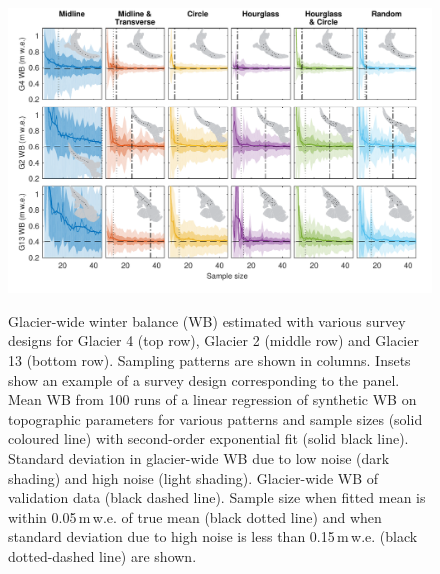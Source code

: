 \documentclass{article}
\begin{document}
\begin{figure}
	\centering
	\includegraphics[width =\textwidth]{SyntheticObsWB.pdf}\\
	\caption{Glacier-wide winter balance (WB) estimated with various survey designs for Glacier 4 (top row), Glacier 2 (middle row) and Glacier 13 (bottom row). Sampling patterns are shown in columns. Insets show an example of a survey design corresponding to the panel. Mean WB from 100 runs of a linear regression of synthetic WB on topographic parameters for various patterns and sample sizes (solid coloured line) with second-order exponential fit (solid black line). Standard deviation in glacier-wide WB due to low noise (dark shading) and high noise (light shading). Glacier-wide WB of validation data (black dashed line). Sample size when fitted mean is within 0.05\,m\,w.e. of true mean (black dotted line) and when standard deviation due to high noise is less than 0.15\,m\,w.e. (black dotted-dashed line) are shown.}
	\label{fig:SyntheticObsWB}
\end{figure}
\end{document}
